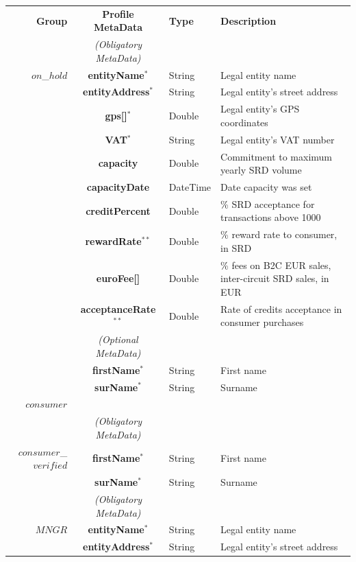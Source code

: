 \setlength{\tabcolsep}{5pt}
\begin{table}[H]
\begin{centering}
\small
{
\begin{tabular}{ r | c | l | l }
\hline
\textbf{Group}	& {\bf Profile MetaData} & {\bf Type} & {\bf Description} \\
\Xhline{1.5pt}
			& \emph{(Obligatory MetaData)} & & \\
\cline{2-2}
$on$\_$hold$	& {\bf entityName}$^*$		&String	& Legal entity name \\
			& {\bf entityAddress}$^*$		&String	& Legal entity's street address \\
			& {\bf gps[]}$^*$			&Double	& Legal entity's GPS coordinates \\
			& {\bf VAT}$^*$				&String	& Legal entity's VAT number \\
			& {\bf capacity}				&Double	& Commitment to maximum yearly SRD volume \\
			& {\bf capacityDate}			&DateTime & Date capacity was set \\
			& {\bf creditPercent}			&Double	& \% SRD acceptance for transactions above 1000 \\
			& {\bf rewardRate}$^{**}$		&Double	& \% reward rate to consumer, in SRD \\
			& {\bf euroFee[]}			&Double	& \% fees on B2C EUR sales, inter-circuit SRD sales, in EUR \\			& {\bf acceptanceRate}$^{**}$	&Double	& Rate of credits acceptance in consumer purchases\\
\cline{2-2}
			 & \emph{(Optional MetaData)}& & \\
\cline{2-2}
			& {\bf firstName}$^*$			&String	& First name \\
			& {\bf surName}$^*$			&String	& Surname \\
\Xhline{1.5pt}
$consumer$	& 	& &  \\
\Xhline{1.5pt}
			& \emph{(Obligatory MetaData)} & & \\
\cline{2-2}
$consumer$\_$verified$ & {\bf firstName}$^*$	&String	& First name \\
			& {\bf surName}$^*$			&String	& Surname \\
\Xhline{1.5pt}
			& \emph{(Obligatory MetaData)} & & \\
\cline{2-2}
$MNGR$ 		& {\bf entityName}$^*$		&String	& Legal entity name \\
			& {\bf entityAddress}$^*$		&String	& Legal entity's street address \\

\end{tabular}}
\end{centering}
\end{table}
